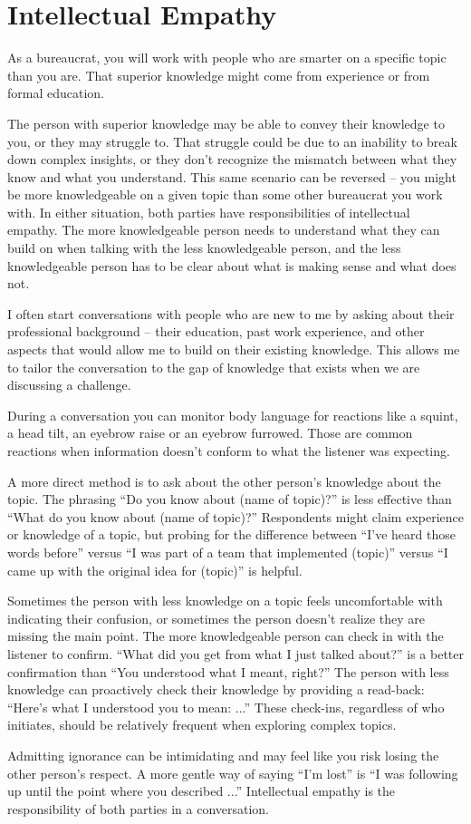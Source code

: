 \section{Intellectual Empathy\label{sec:intellectual-empathy}}

As a bureaucrat, you will work with people who are smarter on a specific topic than you are. That superior knowledge might come from experience or from formal education. 

The person with superior knowledge may be able to convey their knowledge to you, or they may struggle to. That struggle could be due to an inability to break down complex insights, or they don't recognize the mismatch between what they know and what you understand. 
This same scenario can be reversed -- you might be more knowledgeable on a given topic than some other bureaucrat you work with. In either situation, both parties have responsibilities of intellectual empathy. The more knowledgeable person needs to understand what they can build on when talking with the less knowledgeable person, and the less knowledgeable person has to be clear about what is making sense and what does not. 

I often start conversations with people who are new to me by asking about their professional background -- their education, past work experience, and other aspects that would allow me to build on their existing knowledge. This allows me to tailor the conversation to the gap of knowledge that exists when we are discussing a challenge. 

During a conversation you can monitor body language for reactions like a squint, a head tilt, an eyebrow raise or an eyebrow furrowed. Those are common reactions when information doesn't conform to what the listener was expecting. 

A more direct method is to ask about the other person's knowledge about the topic. The phrasing ``Do you know about (name of topic)?'' is less effective than ``What do you know about (name of topic)?'' Respondents might claim experience or knowledge of a topic, but probing for the difference between ``I've heard those words before'' versus ``I was part of a team that implemented (topic)'' versus ``I came up with the original idea for (topic)'' is helpful. 

Sometimes the person with less knowledge on a topic feels uncomfortable with indicating their confusion, or sometimes the person doesn't realize they are missing the main point. The more knowledgeable person can check in with the listener to confirm. ``What did you get from what I just talked about?'' is a better confirmation than ``You understood what I meant, right?'' The person with less knowledge can proactively check their knowledge by providing a read-back: ``Here's what I understood you to mean: ...'' These check-ins, regardless of who initiates, should be relatively frequent when exploring complex topics. 

Admitting ignorance can be intimidating and may feel like you risk losing the other person's respect. A more gentle way of saying ``I'm lost'' is ``I was following up until the point where you described ...'' Intellectual empathy is the responsibility of both parties in a conversation. 